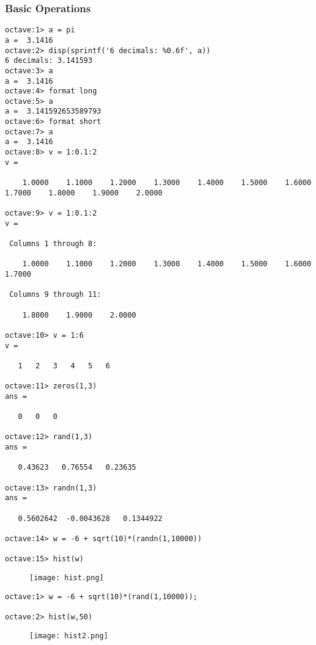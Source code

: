 \subsubsection{Basic Operations}
\begin{lstlisting}[basicstyle=\small]
octave:1> a = pi
a =  3.1416
octave:2> disp(sprintf('6 decimals: %0.6f', a))
6 decimals: 3.141593
octave:3> a
a =  3.1416
octave:4> format long
octave:5> a
a =  3.141592653589793
octave:6> format short
octave:7> a
a =  3.1416
octave:8> v = 1:0.1:2
v =

    1.0000    1.1000    1.2000    1.3000    1.4000    1.5000    1.6000    1.7000    1.8000    1.9000    2.0000

octave:9> v = 1:0.1:2
v =

 Columns 1 through 8:

    1.0000    1.1000    1.2000    1.3000    1.4000    1.5000    1.6000    1.7000

 Columns 9 through 11:

    1.8000    1.9000    2.0000

octave:10> v = 1:6
v =

   1   2   3   4   5   6

octave:11> zeros(1,3)
ans =

   0   0   0

octave:12> rand(1,3)
ans =

   0.43623   0.76554   0.23635

octave:13> randn(1,3)
ans =

   0.5602642  -0.0043628   0.1344922

octave:14> w = -6 + sqrt(10)*(randn(1,10000))

octave:15> hist(w)
\end{lstlisting}

\begin{figure}[h]
  \texttt{[image: hist.png]}
\end{figure}

\begin{lstlisting}[basicstyle=\small]
octave:1> w = -6 + sqrt(10)*(rand(1,10000));

octave:2> hist(w,50)
\end{lstlisting}

\begin{figure}[h]
  \texttt{[image: hist2.png]}
\end{figure}

